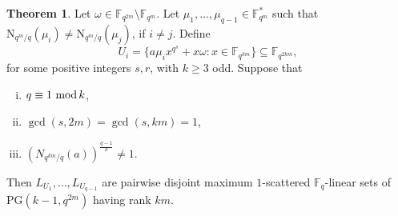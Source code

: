\documentclass[11pt]{amsart}
\theoremstyle{definition}
\newtheorem{theorem}{Theorem}[section]
\newcommand{\F}{{\mathbb F}}
\renewcommand{\mod}{\hbox{{\rm mod}\,}}
\newcommand{\PG}{\mathrm{PG}}
\newcommand{\N}{\mathrm{N}}
\begin{document}
{\begin{theorem} \label{th:constructiondisjoint3}
   Let $\omega \in \F_{q^{2m}} \setminus \F_{q^{m}}$. Let $\mu_1,\ldots,\mu_{q-1} \in \F_{q^m}^*$ such that $\N_{q^m/q}(\mu_i) \neq \N_{q^m/q}(\mu_j)$, if $i \neq j$. Define
\[U_i=\{ a\mu_ix^{q^s}+x\omega \colon x \in  \F_{q^{km}}\} \subseteq \F_{q^{2km}},\]
for some positive integers $s,r$, with $k \geq 3$ odd.
Suppose that  \begin{enumerate}[(i)]
       \item $q \equiv 1 \ \mod k$,
       \item $\gcd(s,2m)=\gcd(s,km)=1$,
       \item $(N_{q^{km}/q}(a))^{\frac{q-1}{k}} \neq 1$.
   \end{enumerate} 
Then $L_{U_1},\ldots,L_{U_{q-1}}$ are pairwise disjoint maximum $1$-scattered $\F_q$-linear sets of $\PG(k-1,q^{2m})$ having rank $km$.
\end{theorem}

}
\end{document}
